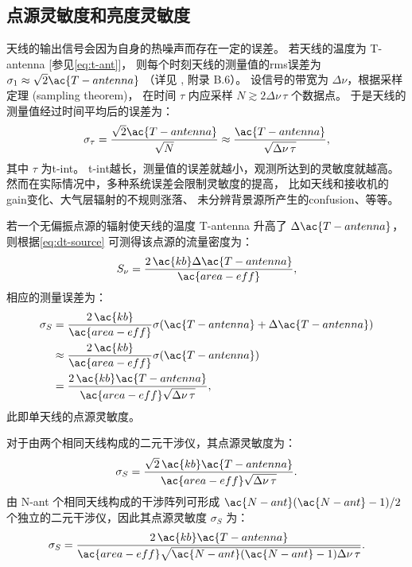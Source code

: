 %

\subsection{点源灵敏度和亮度灵敏度}

天线的输出信号会因为自身的热噪声而存在一定的误差。
若天线的温度为 \ac{T-antenna} [参见\autoref{eq:t-ant}]，
则每个时刻天线的测量值的\ac{rms}误差为
$\sigma_1 \approx \sqrt{2} \ac{T-antenna}$
（详见 , 附录 B.6）。
设信号的带宽为 $\Delta\nu$，根据采样定理 (sampling theorem)，
在时间 $\tau$ 内应采样 $N \gtrsim 2 \Delta\nu \,\tau$ 个数据点。
于是天线的测量值经过时间平均后的误差为：
\begin{equation}
  \label{eq:radiometer}
  \sigma_{\tau}
    = \frac{\sqrt{2} \ac{T-antenna}}{\sqrt{N}}
    \approx \frac{\ac{T-antenna}}{\sqrt{\Delta\nu \,\tau}} ,
\end{equation}
其中 $\tau$ 为\ac{t-int}。
\ac{t-int}越长，测量值的误差就越小，观测所达到的灵敏度就越高。
然而在实际情况中，多种系统误差会限制灵敏度的提高，
比如天线和接收机的\ac{gain}变化、大气层辐射的不规则涨落、
未分辨背景源所产生的\ac{confusion}、等等。

若一个无偏振点源的辐射使天线的温度 \ac{T-antenna} 升高了 $\Delta\ac{T-antenna}$，
则根据\autoref{eq:dt-source} 可测得该点源的流量密度为：
\begin{equation}
  S_{\nu} = \frac{2\,\ac{kb} \Delta\ac{T-antenna}}{\ac{area-eff}} ,
\end{equation}
相应的测量误差为：
\begin{align}
  \sigma_S
    & = \frac{2\,\ac{kb}}{\ac{area-eff}}
        \sigma(\ac{T-antenna} + \Delta\ac{T-antenna}) \\
    & \approx \frac{2\,\ac{kb}}{\ac{area-eff}} \sigma(\ac{T-antenna}) \\
    & = \frac{2\,\ac{kb} \ac{T-antenna}}{
      \ac{area-eff} \sqrt{\Delta\nu \,\tau}} ,
\end{align}
此即单天线的点源灵敏度。

对于由两个相同天线构成的二元干涉仪，其点源灵敏度为：
\begin{equation}
  \sigma_S
    = \frac{\sqrt{2}\,\ac{kb} \ac{T-antenna}}{
        \ac{area-eff} \sqrt{\Delta\nu \,\tau}} .
\end{equation}
由 \ac{N-ant} 个相同天线构成的干涉阵列可形成 $\ac{N-ant}(\ac{N-ant}-1)/2$
个独立的二元干涉仪，因此其点源灵敏度 $\sigma_S$ 为：
\begin{equation}
  \label{eq:sigma-ps}
  \sigma_S
    = \frac{2\,\ac{kb} \ac{T-antenna}}{
        \ac{area-eff} \sqrt{\ac{N-ant}(\ac{N-ant}-1) \Delta\nu \,\tau}} .
\end{equation}

